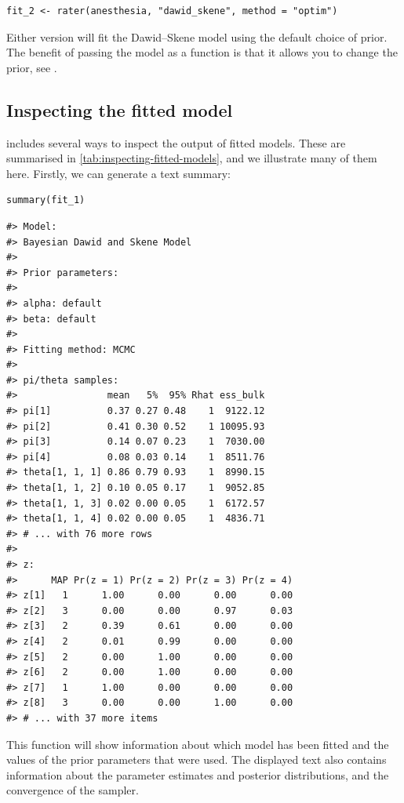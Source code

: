 \begin{verbatim}
fit_2 <- rater(anesthesia, "dawid_skene", method = "optim")
\end{verbatim}

Either version will fit the Dawid--Skene model using the default choice of
prior. The benefit of passing the model as a function is that it allows you to
change the prior, see .

\hypertarget{inspecting-the-fitted-model}{%
\subsection{Inspecting the fitted model}\label{inspecting-the-fitted-model}}

 includes several ways to inspect the output of fitted models.
These are summarised in \autoref{tab:inspecting-fitted-models}, and we
illustrate many of them here. Firstly, we can generate a text summary:

\begin{verbatim}
summary(fit_1)
\end{verbatim}

\begin{verbatim}
#> Model:
#> Bayesian Dawid and Skene Model 
#> 
#> Prior parameters:
#> 
#> alpha: default
#> beta: default
#> 
#> Fitting method: MCMC
#> 
#> pi/theta samples:
#>                mean   5%  95% Rhat ess_bulk
#> pi[1]          0.37 0.27 0.48    1  9122.12
#> pi[2]          0.41 0.30 0.52    1 10095.93
#> pi[3]          0.14 0.07 0.23    1  7030.00
#> pi[4]          0.08 0.03 0.14    1  8511.76
#> theta[1, 1, 1] 0.86 0.79 0.93    1  8990.15
#> theta[1, 1, 2] 0.10 0.05 0.17    1  9052.85
#> theta[1, 1, 3] 0.02 0.00 0.05    1  6172.57
#> theta[1, 1, 4] 0.02 0.00 0.05    1  4836.71
#> # ... with 76 more rows
#> 
#> z:
#>      MAP Pr(z = 1) Pr(z = 2) Pr(z = 3) Pr(z = 4)
#> z[1]   1      1.00      0.00      0.00      0.00
#> z[2]   3      0.00      0.00      0.97      0.03
#> z[3]   2      0.39      0.61      0.00      0.00
#> z[4]   2      0.01      0.99      0.00      0.00
#> z[5]   2      0.00      1.00      0.00      0.00
#> z[6]   2      0.00      1.00      0.00      0.00
#> z[7]   1      1.00      0.00      0.00      0.00
#> z[8]   3      0.00      0.00      1.00      0.00
#> # ... with 37 more items
\end{verbatim}

This function will show information about which model has been fitted and the
values of the prior parameters that were used. The displayed text also contains
information about the parameter estimates and posterior distributions, and the
convergence of the sampler.

